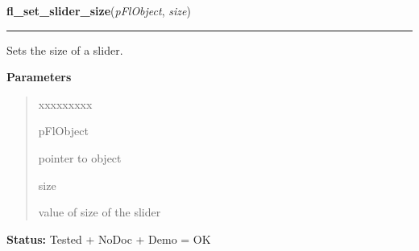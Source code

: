     \label{xformslib:flslider:fl_set_slider_size}

    \vspace{0.5ex}

\hspace{.8\funcindent}\begin{boxedminipage}{\funcwidth}

    \raggedright \textbf{fl\_set\_slider\_size}(\textit{pFlObject}, \textit{size})

    \vspace{-1.5ex}

    \rule{\textwidth}{0.5\fboxrule}
\setlength{\parskip}{2ex}
    Sets the size of a slider.

\setlength{\parskip}{1ex}
      \textbf{Parameters}
      \vspace{-1ex}

      \begin{quote}
        \begin{Ventry}{xxxxxxxxx}

          \item[pFlObject]

          pointer to object

          \item[size]

          value of size of the slider

        \end{Ventry}

      \end{quote}

\textbf{Status:} Tested + NoDoc + Demo = OK



    \end{boxedminipage}

    \label{xformslib:flslider:fl_set_slider_precision}

    \vspace{0.5ex}

